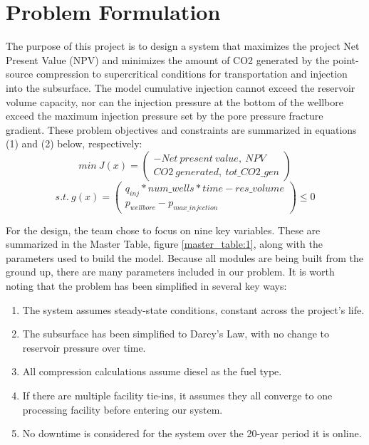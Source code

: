 \documentclass[balance,upint,subscriptcorrection,varvw,mathalfa=cal=boondoxo,spanish,french,vietnamese,russian,greek,pdf-a,colorlinks]{asmeconf}
\begin{document}
\section{Problem Formulation}
The purpose of this project is to design a system that maximizes the project Net Present Value (NPV) and minimizes the amount of CO2 generated by the point-source compression to supercritical conditions for transportation and injection into the subsurface. The model cumulative injection cannot exceed the reservoir volume capacity, nor can the injection pressure at the bottom of the wellbore exceed the maximum injection pressure set by the pore pressure fracture gradient. These problem objectives and constraints are summarized in equations (1) and (2) below, respectively:
\begin{equation}
  min\ J(x) = 
  \begin{pmatrix}
      -Net\ present\ value,\ NPV \\
      CO2\ generated,\ tot\_CO2\_gen
  \end{pmatrix}
\end{equation}
\begin{equation}
  s.t.\ g(x) = 
  \begin{pmatrix}
      q_{inj} * num\_wells * time-res\_volume \\
      p_{wellbore} - p_{max\_injection}
  \end{pmatrix}
  \leq 0
\end{equation}

For the design, the team chose to focus on nine key variables. These are summarized in the Master Table, figure \ref{master_table:1}, along with the parameters used to build the model. Because all modules are being built from the ground up, there are many parameters included in our problem. It is worth noting that the problem has been simplified in several key ways:
\begin{enumerate}
  \item The system assumes steady-state conditions, constant across the project's life.
  \item The subsurface has been simplified to Darcy's Law, with no change to reservoir pressure over time.
  \item All compression calculations assume diesel as the fuel type.
  \item If there are multiple facility tie-ins, it assumes they all converge to one processing facility before entering our system.
  \item No downtime is considered for the system over the 20-year period it is online.
\end{enumerate}
\end{document}
